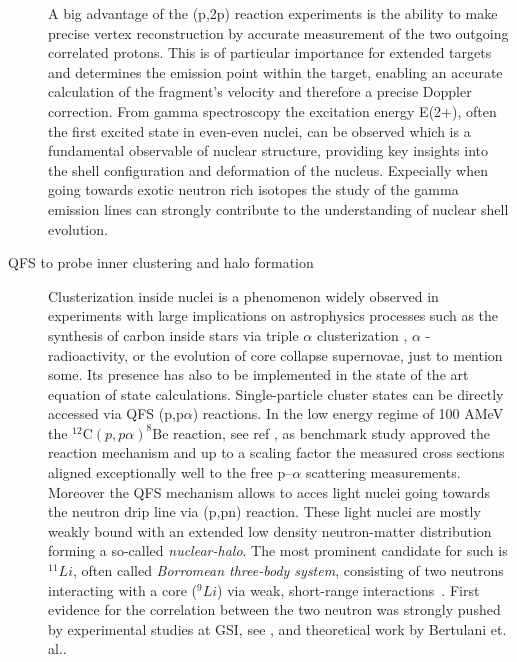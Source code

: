 \begin{description}
A big advantage of the (p,2p) reaction experiments is the ability to make precise vertex reconstruction by accurate measurement of the two outgoing correlated protons. This is of particular importance for extended targets and determines the emission point within the target, enabling an accurate calculation of the fragment's velocity and therefore a precise Doppler correction.\newline
From gamma spectroscopy the excitation energy E(2+), often the first excited state in even-even nuclei, can be observed which is a fundamental observable of nuclear structure, providing key insights into the shell configuration and deformation of the nucleus\cite{panin2021quasi}. Expecially when going towards exotic neutron rich isotopes the study of the gamma emission lines can strongly contribute to the understanding of nuclear shell evolution.
\item[QFS to probe inner clustering and halo formation]Clusterization inside nuclei is a phenomenon widely observed in experiments with large implications on astrophysics processes such as the synthesis of carbon  inside stars via triple $\alpha$ clusterization \cite{hjorth2011carbon}, $\alpha$ - radioactivity, or the evolution of core collapse supernovae\cite{sumiyoshi2008appearance}, just to mention some. Its presence has also to be implemented in the state of the art equation of state calculations.\newline
Single-particle cluster states can be directly accessed via QFS (p,p$\alpha$) reactions. In the low energy regime of 100 AMeV the $^{12}\text{C}(p, p\alpha)^{8}\text{Be}$ reaction, see ref \cite{mabiala2009analyzing}, as benchmark study approved the reaction mechanism and up to a scaling factor the measured cross sections aligned exceptionally well to the free p–$\alpha$ scattering measurements.\newline
Moreover the QFS mechanism allows to acces light nuclei going towards the neutron drip line via (p,pn) reaction. These light nuclei are mostly weakly bound with an extended low density neutron-matter distribution forming a so-called \textit{nuclear-halo}.\newline
The most prominent candidate for such is $^{11}Li$, often called \textit{Borromean three-body system}, consisting of two neutrons interacting with a core ($^9Li$) via weak, short-range interactions~\cite{johannsen199011li}. First evidence for the correlation  between the two neutron was strongly pushed by experimental studies at GSI, see \cite{simon1999direct}, and theoretical work by Bertulani et. al.\cite{bertulani2007geometry}.\newline

\end{description}

